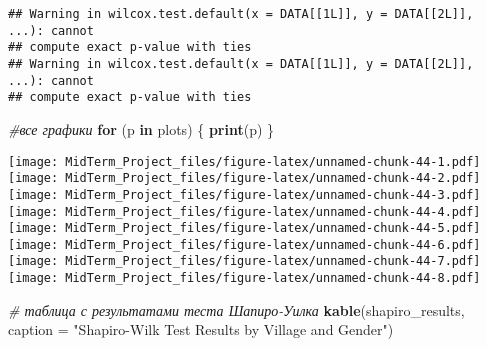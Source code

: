 \documentclass[
]{article}
\newenvironment{Shaded}{\begin{snugshade}}{\end{snugshade}}
\newcommand{\AttributeTok}[1]{\textcolor[rgb]{0.13,0.29,0.53}{#1}}
\newcommand{\CommentTok}[1]{\textcolor[rgb]{0.56,0.35,0.01}{\textit{#1}}}
\newcommand{\ConstantTok}[1]{\textcolor[rgb]{0.56,0.35,0.01}{#1}}
\newcommand{\ControlFlowTok}[1]{\textcolor[rgb]{0.13,0.29,0.53}{\textbf{#1}}}
\newcommand{\DecValTok}[1]{\textcolor[rgb]{0.00,0.00,0.81}{#1}}
\newcommand{\FloatTok}[1]{\textcolor[rgb]{0.00,0.00,0.81}{#1}}
\newcommand{\FunctionTok}[1]{\textcolor[rgb]{0.13,0.29,0.53}{\textbf{#1}}}
\newcommand{\NormalTok}[1]{#1}
\newcommand{\OtherTok}[1]{\textcolor[rgb]{0.56,0.35,0.01}{#1}}
\newcommand{\SpecialCharTok}[1]{\textcolor[rgb]{0.81,0.36,0.00}{\textbf{#1}}}
\newcommand{\StringTok}[1]{\textcolor[rgb]{0.31,0.60,0.02}{#1}}
\begin{document}
\begin{Shaded}
\end{Shaded}

\begin{verbatim}
## Warning in wilcox.test.default(x = DATA[[1L]], y = DATA[[2L]], ...): cannot
## compute exact p-value with ties
## Warning in wilcox.test.default(x = DATA[[1L]], y = DATA[[2L]], ...): cannot
## compute exact p-value with ties
\end{verbatim}

\begin{Shaded}
\begin{Highlighting}[]
\CommentTok{\#все графики}
\ControlFlowTok{for}\NormalTok{ (p }\ControlFlowTok{in}\NormalTok{ plots) \{}
  \FunctionTok{print}\NormalTok{(p)}
\NormalTok{\}}
\end{Highlighting}
\end{Shaded}

\texttt{[image: MidTerm\_Project\_files/figure-latex/unnamed-chunk-44-1.pdf]}
\texttt{[image: MidTerm\_Project\_files/figure-latex/unnamed-chunk-44-2.pdf]}
\texttt{[image: MidTerm\_Project\_files/figure-latex/unnamed-chunk-44-3.pdf]}
\texttt{[image: MidTerm\_Project\_files/figure-latex/unnamed-chunk-44-4.pdf]}
\texttt{[image: MidTerm\_Project\_files/figure-latex/unnamed-chunk-44-5.pdf]}
\texttt{[image: MidTerm\_Project\_files/figure-latex/unnamed-chunk-44-6.pdf]}
\texttt{[image: MidTerm\_Project\_files/figure-latex/unnamed-chunk-44-7.pdf]}
\texttt{[image: MidTerm\_Project\_files/figure-latex/unnamed-chunk-44-8.pdf]}

\begin{Shaded}
\begin{Highlighting}[]
\CommentTok{\# таблица с результатами теста Шапиро{-}Уилка}
\FunctionTok{kable}\NormalTok{(shapiro\_results, }\AttributeTok{caption =} \StringTok{"Shapiro{-}Wilk Test Results by Village and Gender"}\NormalTok{)}
\end{Highlighting}
\end{Shaded}
\end{document}

